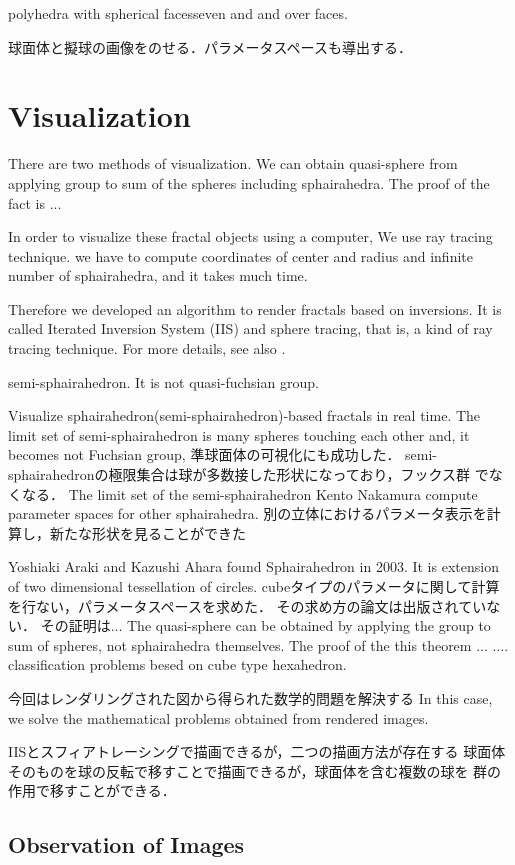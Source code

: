 \documentclass[dvipdfmx]{interact}
\theoremstyle{plain}%
\theoremstyle{definition}
\theoremstyle{remark}
\theoremstyle{problemstyle}
\begin{document}
polyhedra with spherical facesseven and and over faces.

球面体と擬球の画像をのせる．パラメータスペースも導出する．

\section{Visualization}
There are two methods of visualization. 
We can obtain quasi-sphere from applying group to sum of the spheres
including sphairahedra.
The proof of the fact is ...

In order to visualize these fractal objects using a computer,
We use ray tracing technique.
we have to compute coordinates of center and radius and infinite number
of sphairahedra, and it takes much time.

Therefore we developed an algorithm to render fractals based on
inversions. It is called Iterated Inversion System (IIS) and sphere
tracing, that is, a kind of ray tracing technique.
For more details, see also \cite{bridges2018}.

semi-sphairahedron. It is not quasi-fuchsian group.

Visualize sphairahedron(semi-sphairahedron)-based fractals in real time.
The limit set of semi-sphairahedron is many spheres touching each other and,
it becomes not Fuchsian group,
準球面体の可視化にも成功した．
semi-sphairahedronの極限集合は球が多数接した形状になっており，フックス群
でなくなる．
The limit set of the semi-sphairahedron
Kento Nakamura compute parameter spaces for other sphairahedra.
別の立体におけるパラメータ表示を計算し，新たな形状を見ることができた


Yoshiaki Araki and Kazushi Ahara found Sphairahedron in 2003.
It is extension of two dimensional tessellation of circles.
cubeタイプのパラメータに関して計算を行ない，パラメータスペースを求めた．
その求め方の論文は出版されていない．
その証明は...
The quasi-sphere can be obtained by applying the group to sum of
spheres, not sphairahedra themselves.
The proof of the this theorem ... ....
classification problems besed on cube type hexahedron.

今回はレンダリングされた図から得られた数学的問題を解決する
In this case, we solve the mathematical problems obtained from rendered
images.

IISとスフィアトレーシングで描画できるが，二つの描画方法が存在する
球面体そのものを球の反転で移すことで描画できるが，球面体を含む複数の球を
群の作用で移すことができる．

\subsection{Observation of Images}
\end{document}
